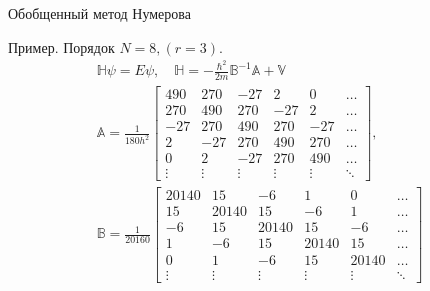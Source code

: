 \documentclass[10pt,pdf,hyperref={unicode},xcolor=dvipsnames]{beamer}
\newcommand{\bbA}{\mathbb{A}}
\newcommand{\bbB}{\mathbb{B}}
\newcommand{\bbV}{\mathbb{V}}
\newcommand{\bbH}{\mathbb{H}}
\begin{document}
\begin{frame}{Обобщенный метод Нумерова}
    \begin{block}{Пример. Порядок $N = 8, (r = 3)$.}
        \vspace*{-0.5cm}
        \begin{gather}
            \bbH \psi = E \psi, \quad \bbH = -\frac{\hbar^2}{2m} \bbB^{-1} \bbA + \bbV \\
            \bbA = \frac{1}{180h^2}
            \begin{bmatrix}
                490 & 270 & -27 & 2 & 0 & \dots \\
                270 & 490 & 270 & -27 & 2 & \dots \\
                -27 & 270 & 490 & 270 & -27 & \dots \\
                  2 & -27 & 270 & 490 & 270 & \dots \\
                  0 & 2   & -27 & 270 & 490 & \dots \\
                  \vdots & \vdots & \vdots & \vdots & \vdots & \ddots
            \end{bmatrix}, \\
            \bbB = \frac{1}{20160}
            \begin{bmatrix}
                20140 & 15 & -6 & 1 & 0 & \dots \\
                15 & 20140 & 15 & -6 & 1 & \dots \\
                -6 & 15 & 20140 & 15 & -6 & \dots \\
                1 & -6 & 15 & 20140 & 15 & \dots \\
                0 & 1 & -6 & 15 & 20140 & \dots \\
                \vdots & \vdots & \vdots & \vdots & \vdots & \ddots
            \end{bmatrix}
        \end{gather}
    \end{block}
\end{frame}
\end{document}
